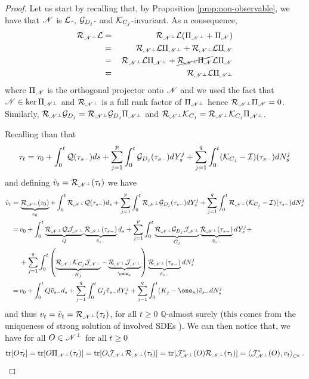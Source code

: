 \documentclass[aihp,12pt]{imsart}
\begin{document}
\begin{proof}
    Let us start by recalling that, by Proposition \ref{prop:non-observable}, we have that $\mathscr{N}$ is $\mathcal{L}$-,  $\mathcal{G}_{D_j}$- and $\mathcal{K}_{C_j}$-invariant. As a consequence, \begin{eqnarray*}\mathcal{R}_{\mathscr{N}^\perp}  \mathcal{L} &=\,& \mathcal{R}_{\mathscr{N}^\perp}  \mathcal{L}  (\Pi_{\mathscr{N}^\perp} + \Pi_{\mathscr{N}})\\ &=\,& \mathcal{R}_{\mathscr{N}^\perp}  \mathcal{L}  \Pi_{\mathscr{N}^\perp} + \mathcal{R}_{\mathscr{N}^\perp}  \mathcal{L}  \Pi_{\mathscr{N}}\\ &=\,& \mathcal{R}_{\mathscr{N}^\perp}  \mathcal{L}  \Pi_{\mathscr{N}^\perp} + \cancel{\mathcal{R}_{\mathscr{N}^\perp}  \Pi_{\mathscr{N}}}  \mathcal{L}  \Pi_{\mathscr{N}}\\& =\,& \mathcal{R}_{\mathscr{N}^\perp}  \mathcal{L}  \Pi_{\mathscr{N}^\perp}
    \end{eqnarray*}where $\Pi_{\mathscr{N}}$ is the orthogonal projector onto $\mathscr{N}$ and we used the fact that $\mathscr{N}\in\ker\Pi_{\mathscr{N}^\perp}$ and $\mathcal{R}_{\mathscr{N}^\perp}$ is a full rank factor of $\Pi_{\mathscr{N}^\perp}$ hence $\mathcal{R}_{\mathscr{N}^\perp}\Pi_{\mathscr{N}} = 0$. Similarly, $\mathcal{R}_{\mathscr{N}^\perp}\mathcal{G}_{D_j} = \mathcal{R}_{\mathscr{N}^\perp}\mathcal{G}_{D_j}\Pi_{\mathscr{N}^\perp}$ and $\mathcal{R}_{\mathscr{N}^\perp}\mathcal{K}_{C_j} = \mathcal{R}_{\mathscr{N}^\perp}\mathcal{K}_{C_j}\Pi_{\mathscr{N}^\perp}$.
    
    Recalling than that 
    \[\tau_t = \tau_0 + \int_{0}^t \mathcal{Q}(\tau_{s-}) ds + \sum_{j=1}^p \int_{0}^t \mathcal{G}_{D_j}(\tau_{s-}) dY_s^j + \sum_{j=1}^q \int_{0}^t (\mathcal{K}_{C_j}-\mathcal{I})(\tau_{s-}) dN_s^j \]
    and defining $\Tilde{v}_t = \mathcal{R}_{\mathscr{N}^\perp}(\tau_t)$ we have 
    \begin{align*}
        \Tilde{v}_t =\,& \underbrace{\Rc_{\Ns^\perp}(\tau_0)}_{{v}_0}  + \int_0^t \Rc_{\Ns^\perp}  \Qc (\tau_{s-}) d_s + \sum_{j=1}^p \int_{0}^t \Rc_{\Ns^\perp}\Gc_{D_j}(\tau_{s-}) dY_s^j + \sum_{j=1}^q \int_{0}^t \Rc_{\Ns^\perp}(\Kc_{C_j}-\Ic)(\tau_{s-}) dN_s^j\\
        =\,& {v}_0 + \int_0^t \underbrace{\Rc_{\Ns^\perp}  \Qc  \Jc_{\Ns^\perp}}_{Q}  \underbrace{\Rc_{\Ns^\perp} (\tau_{s-})}_{\Tilde{v}_{s-}} d_s + \sum_{j=1}^p \int_{0}^t \underbrace{\Rc_{\Ns^\perp}\Gc_{D_j}  \Jc_{\Ns^\perp}}_{G_j}  \underbrace{\Rc_{\Ns^\perp} (\tau_{s-})}_{\Tilde{v}_{s-}} dY_s^j + \\
        &+ \sum_{j=1}^q \int_{0}^t \left(\underbrace{\Rc_{\Ns^\perp}\Kc_{C_j}\Jc_{\Ns^\perp}}_{K_j}-\underbrace{\Rc_{\Ns^\perp}\Jc_{\Ns^\perp}}_{\one_\kappa}\right)\underbrace{\Rc_{\Ns^\perp}(\tau_{s-})}_{\Tilde{v}_{s-}} dN_s^j\\
        =\,& {v}_0 + \int_0^t {Q} {\Tilde{v}_{s-}} d_s + \sum_{j=1}^q \int_{0}^t {G_j} {\Tilde{v}_{s-}} dY_s^j + \sum_{j=1}^q \int_{0}^t ({K_j}-\one_\kappa){\Tilde{v}_{s-}} dN_s^j
    \end{align*}
    and thus \(v_t=\Tilde{v}_t=\mathcal{R}_{\mathscr{N}^\perp}(\tau_t)\), for all $t\geq0$ $\mathbb{Q}$-almost surely (this comes from the uniqueness of strong solution of involved SDEs \cite[Section V.3]{protter2005stochastic}). 
    We can then notice that, we have for all $O\in\mathscr{N}^\perp$  for all $t\geq 0$ 
    \[{\rm tr}[O \tau_t] = {\rm tr}[O \Pi_{\mathscr{N}^\perp}(\tau_t)] = {\rm tr}[O \mathcal{J}_{\mathscr{N}^\perp}\mathcal{R}_{\mathscr{N}^\perp}(\tau_t)] = {\rm tr}[\mathcal{J}_{\mathscr{N}^\perp}^*(O) \mathcal{R}_{\mathscr{N}^\perp}(\tau_t)] = \left< \mathcal{J}_{\mathscr{N}^\perp}^*(O),v_t \right>_{\mathbb{C}^\kappa}.\]


\end{proof}
\end{document}
